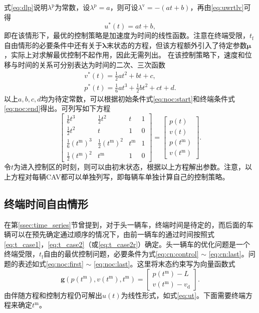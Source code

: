式\ref{eq:dlp}说明$\lambda^\mathrm{p}$为常数，设$\lambda^\mathrm{p}=a$，则可设$\lambda^\mathrm{v}=-(at+b)$，再由\ref{eq:uwrtlv}可得
\begin{equation}
u^*(t)=at+b,
\label{eq:ut}
\end{equation}
即在该情形下，最优的控制策略是加速度为时间的线性函数。注意在终端受限，$t_\mathrm{f}$自由情形的必要条件中还有关于$\bm{\lambda}$末状态的方程，但该方程额外引入了待定参数$\bm{\mu}$，实际上对求解最优控制不起作用，因此无需列出。
在该控制策略下，速度和位移与时间的关系可分别表达为时间的二次、三次函数
\begin{gather}
v^*(t)=\frac12at^2+bt+c,\\
p^*(t)=\frac16at^3+\frac12bt^2+ct+d.
\end{gather}
以上$a,b,c,d$均为待定常数，可以根据初始条件式\ref{eq:noc:start}和终端条件式\ref{eq:noc:end}得出。可列写如下方程
\begin{equation}
\begin{bmatrix}
\frac16t^3 & \frac12t^2 & t & 1 \\
\frac12t^2 & t & 1 & 0 \\
\frac16(t^\mathrm{m})^3 & \frac12(t^\mathrm{m})^2 & t^\mathrm{m} & 1 \\
\frac12(t^\mathrm{m})^2 & t^\mathrm{m} & 1 & 0
\end{bmatrix} = \begin{bmatrix}
p(t)\\v(t)\\p(t^\mathrm{m})\\v(t^\mathrm{m})
\end{bmatrix}.
\label{eq:noc:array}
\end{equation}
令$t$为进入控制区的时刻，则可以由初末状态，根据以上方程解出参数。注意，以上方程对每辆CAV都可以单独列写，即每辆车单独计算自己的控制策略。

\subsection{终端时间自由情形}
\label{ssec:freetf}
在第\ref{ssec:time_series}节曾提到，对于头一辆车，终端时间是待定的，而后面的车辆可以在预先确定通过顺序的情况下，由前一辆车的通过时间按照式\ref{eq:t_case1}，\ref{eq:t_case2}（或\ref{eq:t_case2r}）确定。头一辆车的优化问题是一个终端受限，$t_\mathrm{f}$自由的最优控制问题，必要条件为式\ref{eq:cn:control} $\sim$ \ref{eq:cn:last}。问题的表述如式\ref{eq:noc:first} $\sim$ \ref{eq:noc:last}。这里将末态约束写为向量函数式
\begin{equation}
\bm{g}(p(t^\mathrm{m}),v(t^\mathrm{m}),t^\mathrm{m})=
\begin{bmatrix}
p(t^\mathrm{m})-L\\
v(t^\mathrm{m})-v_\mathrm{d}
\end{bmatrix}.
\end{equation}
由伴随方程和控制方程仍可解出$u(t)$为线性形式，如式\ref{eq:ut}。下面需要终端方程来确定$t^\mathrm{m}$。

